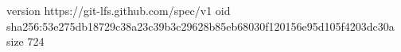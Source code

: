 version https://git-lfs.github.com/spec/v1
oid sha256:53e275db18729c38a23c39b3c29628b85eb68030f120156e95d105f4203dc30a
size 724
